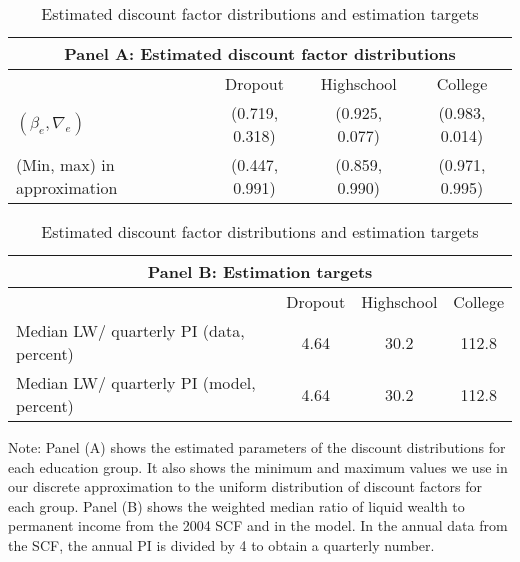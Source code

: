 \documentclass[qe]{econsocart}
\begin{document}
\begin{table}[tb] 
  \caption{Estimated discount factor distributions and estimation targets}
  \label{tab:estimBetas} 
  \centering

  \begin{tabular*}
    {\textwidth}{@{\extracolsep{\fill}}lccc@{}}
    \multicolumn{4}{c}{\small Panel A: Estimated discount factor distributions} \\
    \hline
    & Dropout & Highschool & College \\ \hline
    $(\beta_e, \nabla_e)$ & (0.719, 0.318) & (0.925, 0.077) & (0.983, 0.014) \\
    (Min, max) in approximation & (0.447, 0.991) & (0.859, 0.990) & (0.971, 0.995) \\
    \hline
  \end{tabular*}

  \vspace{0.5em}

  \begin{tabular*}
    {\textwidth}{@{\extracolsep{\fill}}lccc@{}}
    \multicolumn{4}{c}{\small Panel B: Estimation targets} \\
    \hline
    & Dropout & Highschool & College \\ \hline
    Median LW/ quarterly PI (data, percent) & 4.64 & 30.2 & 112.8 \\
    Median LW/ quarterly PI (model, percent) & 4.64 & 30.2 & 112.8 \\
    \hline
  \end{tabular*}

  \noindent\parbox{\textwidth}{
    \medskip
    \footnotesize Note: Panel (A) shows the estimated parameters of the discount distributions for each education group. It also shows the minimum and maximum values we use in our discrete approximation to the uniform distribution of discount factors for each group. Panel (B) shows the weighted median ratio of liquid wealth to permanent income from the 2004 SCF and in the model. In the annual data from the SCF, the annual PI is divided by 4 to obtain a quarterly number.
  }

\end{table}
\end{document}
